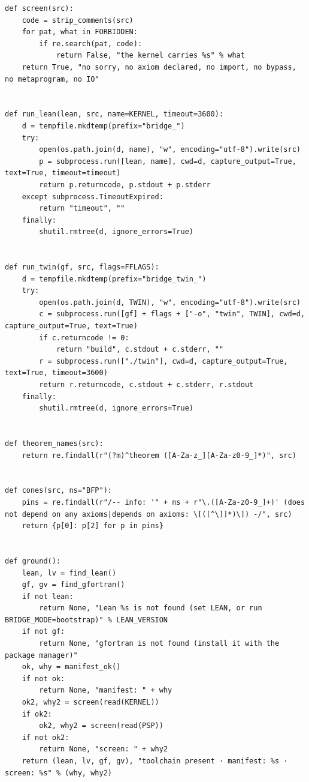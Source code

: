 \documentclass[10pt,twocolumn]{article}
\begin{document}
\begin{Verbatim}
def screen(src):
    code = strip_comments(src)
    for pat, what in FORBIDDEN:
        if re.search(pat, code):
            return False, "the kernel carries %s" % what
    return True, "no sorry, no axiom declared, no import, no bypass, no metaprogram, no IO"


def run_lean(lean, src, name=KERNEL, timeout=3600):
    d = tempfile.mkdtemp(prefix="bridge_")
    try:
        open(os.path.join(d, name), "w", encoding="utf-8").write(src)
        p = subprocess.run([lean, name], cwd=d, capture_output=True, text=True, timeout=timeout)
        return p.returncode, p.stdout + p.stderr
    except subprocess.TimeoutExpired:
        return "timeout", ""
    finally:
        shutil.rmtree(d, ignore_errors=True)


def run_twin(gf, src, flags=FFLAGS):
    d = tempfile.mkdtemp(prefix="bridge_twin_")
    try:
        open(os.path.join(d, TWIN), "w", encoding="utf-8").write(src)
        c = subprocess.run([gf] + flags + ["-o", "twin", TWIN], cwd=d, capture_output=True, text=True)
        if c.returncode != 0:
            return "build", c.stdout + c.stderr, ""
        r = subprocess.run(["./twin"], cwd=d, capture_output=True, text=True, timeout=3600)
        return r.returncode, c.stdout + c.stderr, r.stdout
    finally:
        shutil.rmtree(d, ignore_errors=True)


def theorem_names(src):
    return re.findall(r"(?m)^theorem ([A-Za-z_][A-Za-z0-9_]*)", src)


def cones(src, ns="BFP"):
    pins = re.findall(r"/-- info: '" + ns + r"\.([A-Za-z0-9_]+)' (does not depend on any axioms|depends on axioms: \[([^\]]*)\]) -/", src)
    return {p[0]: p[2] for p in pins}


def ground():
    lean, lv = find_lean()
    gf, gv = find_gfortran()
    if not lean:
        return None, "Lean %s is not found (set LEAN, or run BRIDGE_MODE=bootstrap)" % LEAN_VERSION
    if not gf:
        return None, "gfortran is not found (install it with the package manager)"
    ok, why = manifest_ok()
    if not ok:
        return None, "manifest: " + why
    ok2, why2 = screen(read(KERNEL))
    if ok2:
        ok2, why2 = screen(read(PSP))
    if not ok2:
        return None, "screen: " + why2
    return (lean, lv, gf, gv), "toolchain present · manifest: %s · screen: %s" % (why, why2)



\end{Verbatim}
\end{document}
